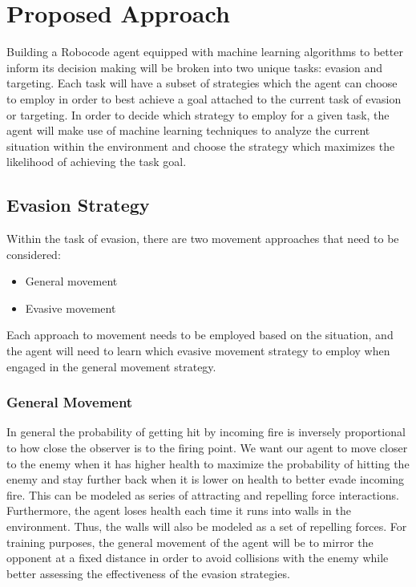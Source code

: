 \documentclass{article}
\theoremstyle{plain}
\theoremstyle{definition}
\theoremstyle{remark}
\begin{document}
\section{Proposed Approach}

Building a Robocode agent equipped with machine learning algorithms to better inform its decision making will be broken into two unique tasks: evasion and targeting. Each task will have a subset of strategies which the agent can choose to employ in order to best achieve a goal attached to the current task of evasion or targeting. In order to decide which strategy to employ for a given task, the agent will make use of machine learning techniques to analyze the current situation within the environment and choose the strategy which maximizes the likelihood of achieving the task goal. 

\subsection*{Evasion Strategy}

Within the task of evasion, there are two movement approaches that need to be considered:
\begin{itemize}

\item General movement 

\item Evasive movement 
\end{itemize}

Each approach to movement needs to be employed based on the situation,  and the agent will need to learn which evasive movement strategy to employ when engaged in the general movement strategy.

\subsubsection*{General Movement }
In general the probability of getting hit by incoming fire is inversely proportional to how close the observer is to the firing point. We want our agent to move closer to the enemy when it has higher health to maximize the probability of hitting the enemy and stay further back when it is lower on health to better evade incoming fire. This can be modeled as series of attracting and repelling force interactions. Furthermore, the agent loses health each time it runs into walls in the environment. Thus, the walls will also be modeled as a set of repelling forces. For training purposes, the general movement of the agent will be to mirror the opponent at a fixed distance in order to avoid collisions with the enemy while better assessing the effectiveness of the evasion strategies. 
\end{document}
